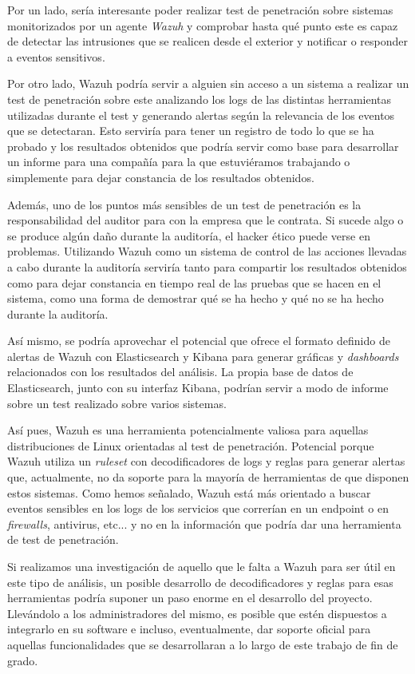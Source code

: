 Por un lado, sería interesante poder realizar test de penetración sobre sistemas monitorizados por un agente \textit{Wazuh} y comprobar hasta qué punto este es capaz de detectar las intrusiones que se realicen desde el exterior y notificar o responder a eventos sensitivos.

Por otro lado, Wazuh podría servir a alguien sin acceso a un sistema a realizar un test de penetración sobre este analizando los logs de las distintas herramientas utilizadas durante el test y generando alertas según la relevancia de los eventos que se detectaran. Esto serviría para tener un registro de todo lo que se ha probado y los resultados obtenidos que podría servir como base para desarrollar un informe para una compañía para la que estuviéramos trabajando o simplemente para dejar constancia de los resultados obtenidos.

Además, uno de los puntos más sensibles de un test de penetración es la responsabilidad del auditor para con la empresa que le contrata. Si sucede algo o se produce algún daño durante la auditoría, el hacker ético puede verse en problemas. Utilizando Wazuh como un sistema de control de las acciones llevadas a cabo durante la auditoría serviría tanto para compartir los resultados obtenidos como para dejar constancia en tiempo real de las pruebas que se hacen en el sistema, como una forma de demostrar qué se ha hecho y qué no se ha hecho durante la auditoría.

Así mismo, se podría aprovechar el potencial que ofrece el formato definido de alertas de Wazuh con Elasticsearch y Kibana para generar gráficas y \textit{dashboards} relacionados con los resultados del análisis. La propia base de datos de Elasticsearch, junto con su interfaz Kibana, podrían servir a modo de informe sobre un test realizado sobre varios sistemas.

Así pues, Wazuh es una herramienta potencialmente valiosa para aquellas distribuciones de Linux orientadas al test de penetración. Potencial porque Wazuh utiliza un \textit{ruleset} con decodificadores de logs y reglas para generar alertas que, actualmente, no da soporte para la mayoría de herramientas de que disponen estos sistemas. Como hemos señalado, Wazuh está más orientado a buscar eventos sensibles en los logs de los servicios que correrían en un endpoint o en \textit{firewalls}, antivirus, etc... y no en la información que podría dar una herramienta de test de penetración.

Si realizamos una investigación de aquello que le falta a Wazuh para ser útil en este tipo de análisis, un posible desarrollo de decodificadores y reglas para esas herramientas podría suponer un paso enorme en el desarrollo del proyecto. Llevándolo a los administradores del mismo, es posible que estén dispuestos a integrarlo en su software e incluso, eventualmente, dar soporte oficial para aquellas funcionalidades que se desarrollaran a lo largo de este trabajo de fin de grado.

